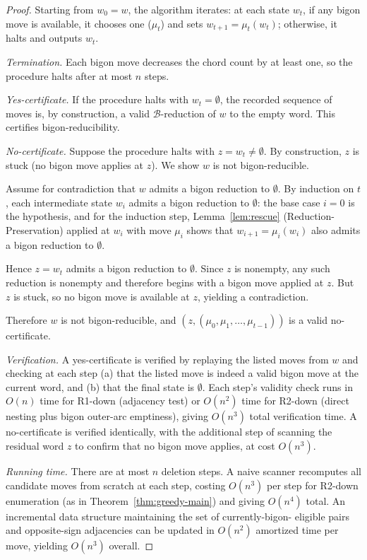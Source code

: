 \begin{proof}
Starting from $w_0 = w$, the algorithm iterates: at each state $w_t$,
if any bigon move is available, it chooses one ($\mu_t$) and sets
$w_{t+1} = \mu_t(w_t)$; otherwise, it halts and outputs $w_t$.

\emph{Termination.} Each bigon move decreases the chord count by at
least one, so the procedure halts after at most $n$ steps.

\emph{Yes-certificate.} If the procedure halts with $w_t = \emptyset$,
the recorded sequence of moves is, by construction, a valid
$\mathcal{B}$-reduction of $w$ to the empty word. This certifies
bigon-reducibility.

\emph{No-certificate.} Suppose the procedure halts with
$z = w_t \neq \emptyset$. By construction, $z$ is stuck (no bigon
move applies at $z$). We show $w$ is not bigon-reducible.

Assume for contradiction that $w$ admits a bigon reduction to
$\emptyset$. By induction on $t$, each intermediate state $w_i$
admits a bigon reduction to $\emptyset$: the base case $i = 0$ is the
hypothesis, and for the induction step, Lemma~\ref{lem:rescue}
(Reduction-Preservation) applied at $w_i$ with move $\mu_i$
shows that $w_{i+1} = \mu_i(w_i)$ also admits a bigon reduction to
$\emptyset$.

Hence $z = w_t$ admits a bigon reduction to $\emptyset$. Since $z$ is
nonempty, any such reduction is nonempty and therefore begins with a
bigon move applied at $z$. But $z$ is stuck, so no bigon move is
available at $z$, yielding a contradiction.

Therefore $w$ is not bigon-reducible, and $(z, (\mu_0, \mu_1, \ldots,
\mu_{t-1}))$ is a valid no-certificate.

\emph{Verification.} A yes-certificate is verified by replaying the
listed moves from $w$ and checking at each step (a) that the listed
move is indeed a valid bigon move at the current word, and (b) that
the final state is $\emptyset$. Each step's validity check runs in
$O(n)$ time for R1-down (adjacency test) or $O(n^2)$ time for
R2-down (direct nesting plus bigon outer-arc emptiness), giving
$O(n^3)$ total verification time. A no-certificate is verified
identically, with the additional step of scanning the residual word
$z$ to confirm that no bigon move applies, at cost $O(n^3)$.

\emph{Running time.} There are at most $n$ deletion steps. A naive
scanner recomputes all candidate moves from scratch at each step,
costing $O(n^3)$ per step for R2-down enumeration (as in
Theorem~\ref{thm:greedy-main}) and giving $O(n^4)$ total. An
incremental data structure maintaining the set of currently-bigon-
eligible pairs and opposite-sign adjacencies can be updated in
$O(n^2)$ amortized time per move, yielding $O(n^3)$ overall.
\end{proof}

